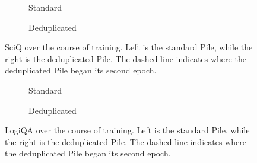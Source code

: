 \documentclass{article}
\theoremstyle{plain}
\theoremstyle{definition}
\theoremstyle{remark}
\begin{document}
\begin{figure}[h]
\centering
\begin{subfigure}{0.45\columnwidth}
\centering
{}
\caption{Standard}
\end{subfigure}
\begin{subfigure}{0.45\columnwidth}
\centering
{}
\caption{Deduplicated}
\end{subfigure}
\caption{SciQ over the course of training. Left is the standard Pile, while the right is the deduplicated Pile. The dashed line indicates where the deduplicated Pile began its second epoch.}
\end{figure}


\begin{figure}[h]
\centering
\begin{subfigure}{0.45\columnwidth}
\centering
{}
\caption{Standard}
\end{subfigure}
\begin{subfigure}{0.45\columnwidth}
\centering
{}
\caption{Deduplicated}
\end{subfigure}
\caption{LogiQA over the course of training. Left is the standard Pile, while the right is the deduplicated Pile. The dashed line indicates where the deduplicated Pile began its second epoch.}
\end{figure} 

\clearpage
\end{document}
